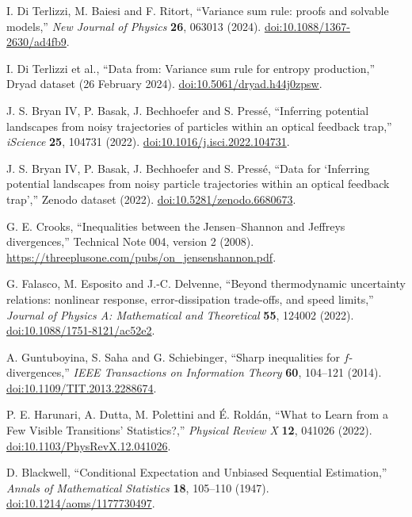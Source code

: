 I. Di Terlizzi, M. Baiesi and F. Ritort,
``Variance sum rule: proofs and solvable models,''
\emph{New Journal of Physics} \textbf{26}, 063013 (2024).
\href{https://doi.org/10.1088/1367-2630/ad4fb9}{doi:10.1088/1367-2630/ad4fb9}.

I. Di Terlizzi et al.,
``Data from: Variance sum rule for entropy production,''
Dryad dataset (26 February 2024).
\href{https://doi.org/10.5061/dryad.h44j0zpsw}{doi:10.5061/dryad.h44j0zpsw}.

J. S. Bryan IV, P. Basak, J. Bechhoefer and S. Press\'e,
``Inferring potential landscapes from noisy trajectories of particles within an optical feedback trap,''
\emph{iScience} \textbf{25}, 104731 (2022).
\href{https://doi.org/10.1016/j.isci.2022.104731}{doi:10.1016/j.isci.2022.104731}.

 J. S. Bryan IV, P. Basak, J. Bechhoefer and S. Press\'e,
``Data for `Inferring potential landscapes from noisy particle trajectories within an optical feedback trap',''
Zenodo dataset (2022).
\href{https://doi.org/10.5281/zenodo.6680673}{doi:10.5281/zenodo.6680673}.

G. E. Crooks,
``Inequalities between the Jensen--Shannon and Jeffreys divergences,''
Technical Note 004, version 2 (2008).
\url{https://threeplusone.com/pubs/on_jensenshannon.pdf}.

G. Falasco, M. Esposito and J.-C. Delvenne,
``Beyond thermodynamic uncertainty relations: nonlinear response,
error-dissipation trade-offs, and speed limits,''
\emph{Journal of Physics A: Mathematical and Theoretical}
\textbf{55}, 124002 (2022).
\href{https://doi.org/10.1088/1751-8121/ac52e2}{doi:10.1088/1751-8121/ac52e2}.

A. Guntuboyina, S. Saha and G. Schiebinger,
``Sharp inequalities for $f$-divergences,''
\emph{IEEE Transactions on Information Theory} \textbf{60}, 104--121 (2014).
\href{https://doi.org/10.1109/TIT.2013.2288674}{doi:10.1109/TIT.2013.2288674}.

P. E. Harunari, A. Dutta, M. Polettini and \'{E}. Rold\'an,
``What to Learn from a Few Visible Transitions' Statistics?,''
\emph{Physical Review X} \textbf{12}, 041026 (2022).
\href{https://doi.org/10.1103/PhysRevX.12.041026}{doi:10.1103/PhysRevX.12.041026}.

D. Blackwell,
``Conditional Expectation and Unbiased Sequential Estimation,''
\emph{Annals of Mathematical Statistics} \textbf{18}, 105--110 (1947).
\href{https://doi.org/10.1214/aoms/1177730497}{doi:10.1214/aoms/1177730497}.

